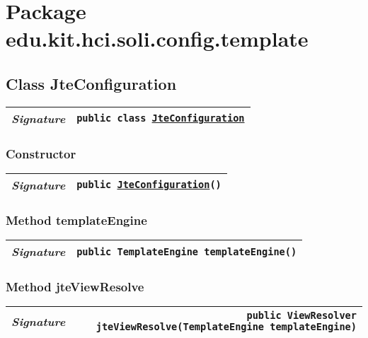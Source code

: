 

\section{Package edu.kit.hci.soli.config.template}
\begin{adjustwidth}{1.5em}{0pt}
  \subsection{Class JteConfiguration\label{edu.kit.hci.soli.config.template.JteConfiguration} }
  \begin{adjustwidth}{1.5em}{0pt}
    {\begin{tabularx}{1.0\linewidth}{@{}l R@{}}
      \emph{Signature} & \texttt{public  class \texttt{\hyperref[edu.kit.hci.soli.config.template.JteConfiguration]{\texttt{JteConfiguration}}}} \\
      \hline
  
    \end{tabularx}}\subsubsection{Constructor\label{edu.kit.hci.soli.config.template.JteConfiguration@edu.kit.hci.soli.config.template.JteConfiguration()}}
    \begin{adjustwidth}{1.5em}{0pt}
      {\begin{tabularx}{1.0\linewidth}{@{}l R@{}}
        \emph{Signature} & \texttt{public \texttt{\hyperref[edu.kit.hci.soli.config.template.JteConfiguration]{\texttt{JteConfiguration}}}()} \\
        \hline
  
      \end{tabularx}}
    \end{adjustwidth}\subsubsection{Method templateEngine\label{edu.kit.hci.soli.config.template.JteConfiguration@templateEngine()}}
    \begin{adjustwidth}{1.5em}{0pt}
      {\begin{tabularx}{1.0\linewidth}{@{}l R@{}}
        \emph{Signature} & \texttt{public \texttt{TemplateEngine} templateEngine()} \\
        \hline
  
      \end{tabularx}}
    \end{adjustwidth}\subsubsection{Method jteViewResolve\label{edu.kit.hci.soli.config.template.JteConfiguration@jteViewResolve(gg.jte.TemplateEngine)}}
    \begin{adjustwidth}{1.5em}{0pt}
      {\begin{tabularx}{1.0\linewidth}{@{}l R@{}}
        \emph{Signature} & \texttt{public \texttt{ViewResolver} jteViewResolve(\texttt{TemplateEngine} templateEngine)} \\
        \hline
  

\end{tabularx}}
\end{adjustwidth}
\end{adjustwidth}
\end{adjustwidth}
